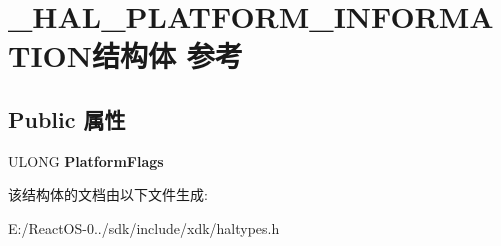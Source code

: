 \hypertarget{struct___h_a_l___p_l_a_t_f_o_r_m___i_n_f_o_r_m_a_t_i_o_n}{}\section{\+\_\+\+H\+A\+L\+\_\+\+P\+L\+A\+T\+F\+O\+R\+M\+\_\+\+I\+N\+F\+O\+R\+M\+A\+T\+I\+O\+N结构体 参考}
\label{struct___h_a_l___p_l_a_t_f_o_r_m___i_n_f_o_r_m_a_t_i_o_n}
\subsection*{Public 属性}
\begin{DoxyCompactItemize}
\item 
\mbox{\label{struct___h_a_l___p_l_a_t_f_o_r_m___i_n_f_o_r_m_a_t_i_o_n_a540adae099c8e62c6a46a25198ab7d4d}} 
U\+L\+O\+NG {\bfseries Platform\+Flags}
\end{DoxyCompactItemize}


该结构体的文档由以下文件生成\+:\begin{DoxyCompactItemize}
\item 
E\+:/\+React\+O\+S-\/0../sdk/include/xdk/haltypes.\+h\end{DoxyCompactItemize}
